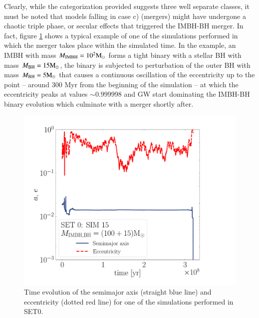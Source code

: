 \documentclass[article]{aa}
\newcommand{\Ms}{{\rm M}_\odot}
\newcommand{\ibh}{{\rm IMBH}}
\newcommand{\bh}{{\rm BH}}
\begin{document}
{Clearly, while the categorization provided suggests three well separate classes, it must be noted that models falling in case c) (mergers) might have undergone a chaotic triple phase, or secular effects that triggered the IMBH-BH merger. In fact, figure \ref{fig:example} shows a typical example of one of the simulations performed in which the merger takes place within the simulated time. In the example, an IMBH with mass $M_\ibh = 10^2\Ms$ forms a tight binary with a stellar BH with mass $M_\bh = 15\Ms$, the binary is subjected to perturbation of the outer BH with mass $M_\bh = 5\Ms$ that causes a continuous oscillation of the eccentricity up to the point -- around 300 Myr from the beginning of the simulation -- at which the eccentricity peaks at values $\sim 0.999998$ and GW start dominating the IMBH-BH binary evolution which culminate with a merger shortly after.  
}
\begin{figure}
\includegraphics[width=\columnwidth]{example}
    \caption{Time evolution of the semimajor axis (straight blue line) and eccentricity (dotted red line) for one of the simulations performed in SET0.}
	\label{fig:example}
\end{figure}
\end{document}
